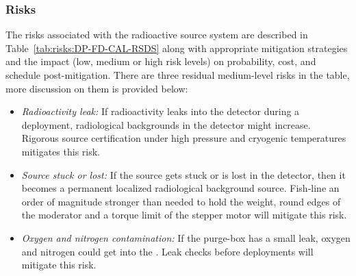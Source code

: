 \subsubsection{Risks}
The risks associated with the radioactive source system are described in Table~\ref{tab:risks:DP-FD-CAL-RSDS} along with appropriate mitigation strategies and the impact (low, medium or high risk levels) on probability, cost, and schedule post-mitigation. There are three residual medium-level risks in the table, more discussion on them is provided below:
\begin{itemize}
    \item {\it Radioactivity leak:} If radioactivity leaks into the detector during a deployment, radiological backgrounds in the detector might increase. Rigorous source certification under high pressure and cryogenic temperatures mitigates this risk.
    \item {\it Source stuck or lost:} If the source gets stuck or is lost in the detector, then it becomes a permanent localized radiological background source. Fish-line an order of magnitude stronger than needed to hold the weight, round edges of the moderator and a torque limit of the stepper motor will mitigate this risk.
    \item {\it Oxygen and nitrogen contamination:} If the purge-box has a small leak, oxygen and nitrogen could get into the . Leak checks before deployments will mitigate this risk.
\end{itemize}




